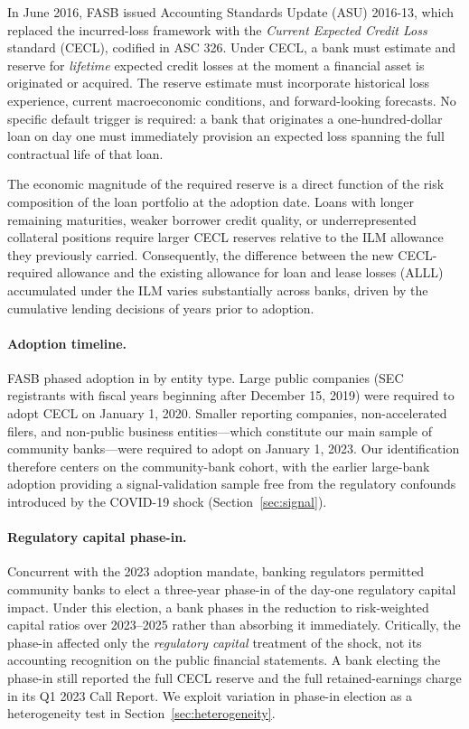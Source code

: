 In June 2016, FASB issued Accounting Standards Update (ASU) 2016-13, which
replaced the incurred-loss framework with the \textit{Current Expected Credit
Loss} standard (CECL), codified in ASC 326. Under CECL, a bank must estimate and
reserve for \textit{lifetime} expected credit losses at the moment a financial
asset is originated or acquired. The reserve estimate must incorporate historical
loss experience, current macroeconomic conditions, and forward-looking forecasts.
No specific default trigger is required: a bank that originates a one-hundred-dollar
loan on day one must immediately provision an expected loss spanning the full
contractual life of that loan.

The economic magnitude of the required reserve is a direct function of the
risk composition of the loan portfolio at the adoption date. Loans with longer
remaining maturities, weaker borrower credit quality, or underrepresented collateral
positions require larger CECL reserves relative to the ILM allowance they
previously carried. Consequently, the difference between the new CECL-required
allowance and the existing allowance for loan and lease losses (ALLL) accumulated
under the ILM varies substantially across banks, driven by the cumulative
lending decisions of years prior to adoption.

\paragraph{Adoption timeline.}
FASB phased adoption in by entity type. Large public companies (SEC registrants
with fiscal years beginning after December 15, 2019) were required to adopt CECL
on January 1, 2020. Smaller reporting companies, non-accelerated filers, and
non-public business entities—which constitute our main sample of community
banks—were required to adopt on January 1, 2023. Our identification therefore
centers on the community-bank cohort, with the earlier large-bank adoption
providing a signal-validation sample free from the regulatory confounds
introduced by the COVID-19 shock (Section~\ref{sec:signal}).

\paragraph{Regulatory capital phase-in.}
Concurrent with the 2023 adoption mandate, banking regulators permitted community
banks to elect a three-year phase-in of the day-one regulatory capital impact.
Under this election, a bank phases in the reduction to risk-weighted capital
ratios over 2023–2025 rather than absorbing it immediately. Critically, the
phase-in affected only the \textit{regulatory capital} treatment of the shock, not
its accounting recognition on the public financial statements. A bank electing the
phase-in still reported the full CECL reserve and the full retained-earnings
charge in its Q1 2023 Call Report. We exploit variation in phase-in election as
a heterogeneity test in Section~\ref{sec:heterogeneity}.

